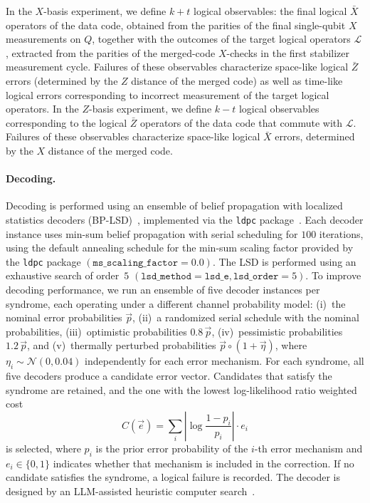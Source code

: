 \documentclass[reprint,twocolumn,secnumarabic,amssymb, aps, prx]{revtex4-2}
\begin{document}
In the $X$-basis experiment, we define $k+t$ logical observables: the final logical $\bar{X}$ operators of the data code, obtained from the parities of the final single-qubit $X$ measurements on $Q$, together with the outcomes of the target logical operators $\mathcal{L}$, extracted from the parities of the merged-code $X$-checks in the first stabilizer measurement cycle. Failures of these observables characterize space-like logical $\bar{Z}$ errors (determined by the $Z$ distance of the merged code) as well as time-like logical errors corresponding to incorrect measurement of the target logical operators. In the $Z$-basis experiment, we define $k-t$ logical observables corresponding to the logical $\bar{Z}$ operators of the data code that commute with $\mathcal{L}$. Failures of these observables characterize space-like logical $\bar{X}$ errors, determined by the $X$ distance of the merged code.

\paragraph{Decoding.}
Decoding is performed using an ensemble of belief propagation with localized statistics decoders (BP-LSD)~\cite{hillmann2024localized}, implemented via the \texttt{ldpc} package~\cite{Roffe_LDPC_Python_tools_2022}. Each decoder instance uses min-sum belief propagation with serial scheduling for $100$ iterations, using the default annealing schedule for the min-sum scaling factor provided by the \texttt{ldpc} package $(\texttt{ms\_scaling\_factor} = 0.0)$. The LSD is performed using an exhaustive search of order~$5$ $(\texttt{lsd\_method} = \texttt{lsd\_e}, \texttt{lsd\_order} = 5)$. To improve decoding performance, we run an ensemble of five decoder instances per syndrome, each operating under a different channel probability model: (i)~the nominal error probabilities $\vec{p}$, (ii)~a randomized serial schedule with the nominal probabilities, (iii)~optimistic probabilities $0.8\,\vec{p}$, (iv)~pessimistic probabilities $1.2\,\vec{p}$, and (v)~thermally perturbed probabilities $\vec{p} \circ (1 + \vec{\eta})$, where $\eta_i \sim \mathcal{N}(0, 0.04)$ independently for each error mechanism. For each syndrome, all five decoders produce a candidate error vector. Candidates that satisfy the syndrome are retained, and the one with the lowest log-likelihood ratio weighted cost
\begin{equation}\label{eq:llr_cost}
  C(\vec{e}) = \sum_i \left|\log \frac{1 - p_i}{p_i}\right| \cdot e_i
\end{equation}
is selected, where $p_i$ is the prior error probability of the $i$-th error mechanism and $e_i \in \{0,1\}$ indicates whether that mechanism is included in the correction. If no candidate satisfies the syndrome, a logical failure is recorded. The decoder is designed by an LLM-assisted heuristic computer search~\cite{caltech2026codeatlas}.
\end{document}
